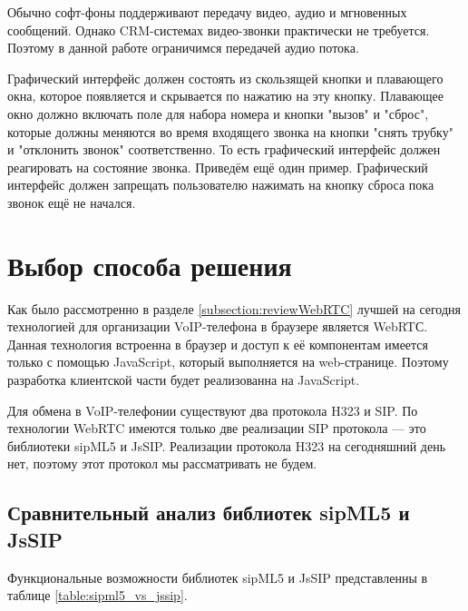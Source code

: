 Обычно софт-фоны поддерживают передачу видео, аудио и мгновенных сообщений. Однако CRM-системах видео-звонки практически не требуется. Поэтому в данной работе ограничимся передачей аудио потока.

Графический интерфейс должен состоять из скользящей кнопки и плавающего окна, которое появляется и скрывается по нажатию на эту кнопку. Плавающее окно должно включать поле для набора номера и кнопки "вызов" и "сброс", которые должны меняются во время входящего звонка на кнопки "снять трубку" и "отклонить звонок" соответственно. То есть графический интерфейс должен реагировать на состояние звонка. Приведём ещё один пример. Графический интерфейс должен запрещать пользователю нажимать на кнопку сброса пока звонок ещё не начался.

\section{Выбор способа решения}

Как было рассмотренно в разделе \ref{subsection:reviewWebRTC} лучшей на сегодня технологией для организации VoIP-телефона в браузере является WebRTС. Данная технология встроенна в браузер и доступ к её компонентам имеется только с помощью JavaScript, который выполняется на web-странице. Поэтому разработка клиентской части будет реализованна на JavaScript.

Для обмена в VoIP-телефонии существуют два протокола H323 и SIP. По технологии WebRTC имеются только две реализации SIP протокола --- это библиотеки sipML5 и JsSIP. Реализации протокола H323 на сегодняшний день нет, поэтому этот протокол мы рассматривать не будем.

\subsection{Сравнительный анализ библиотек sipML5 и JsSIP}

Функциональные возможности библиотек sipML5 и JsSIP представленны в таблице \ref{table:sipml5_vs_jssip}.\cite{sipML5}\cite{JsSIP}

